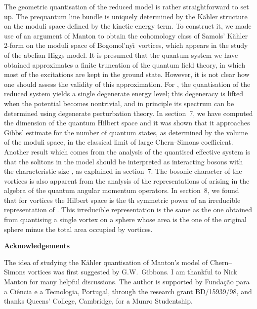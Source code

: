 \documentclass[a4paper,11pt]{article}
\begin{document}
The geometric quantisation of the reduced model is rather
straightforward to set up. The prequantum line bundle is uniquely 
determined by the K\"ahler structure on the moduli space defined by 
the kinetic energy term. To construct it, we made use of an 
argument of Manton \cite{Msmv} to obtain the cohomology class of  
Samols' K\"ahler 2-form on the moduli space of Bogomol'ny\u\i\
vortices, which appears in the study of the abelian Higgs model. 
It is presumed that the quantum system we have obtained 
approximates a finite truncation of the quantum field theory,
in which most of the excitations are kept in the ground state.
However, it is not clear how one should assess the validity of
this approximation.
For \coordHE{}, the quantisation of the reduced system yields a
single degenerate energy level; this degeneracy is lifted when the
potential becomes nontrivial, and in principle its spectrum can be 
determined using degenerate perturbation theory.
In section~7, we have computed the dimension of the
quantum Hilbert space and it was shown that it approaches
Gibbs' estimate for the number of quantum states, as determined by the 
volume of the moduli space, in the classical limit of large 
Chern--Simons coefficient. Another result which comes from the
analysis of the quantised effective system is that the solitons in
the model should be interpreted as interacting bosons with the
characteristic size \myHighlight{$4\pi$}\coordHE{}, as explained in section~7. The bosonic
character of the vortices is also apparent from the analysis of
the representations of \coordHE{} arising in the algebra of the quantum
angular momentum operators. In section~8, we found that 
for \coordHE{} vortices the Hilbert space is the \coordHE{}th symmetric power of an
irreducible representation of \myHighlight{$SO(3)$}\coordHE{}. This irreducible representation
is the same as the one obtained from quantising a single vortex on a 
sphere whose area is the one of the original sphere minus the total area 
occupied by \myHighlight{$N$}\coordHE{} vortices. 
 

\vspace{2cm}
\noindent
{\large \bf{Acknowledgements}}
\vspace{.5cm}

\noindent
The idea of studying the K\"ahler quantisation of Manton's model
of Chern--Simons vortices was first suggested by G.W.~Gibbons.
I am thankful to Nick Manton for many helpful discussions.
The author is supported by Funda\c{c}\~ao para a Ci\^encia e a
Tecnologia, Portugal, through the research grant BD/15939/98, and
thanks Queens' College, Cambridge, for a Munro Studentship.
\end{document}
